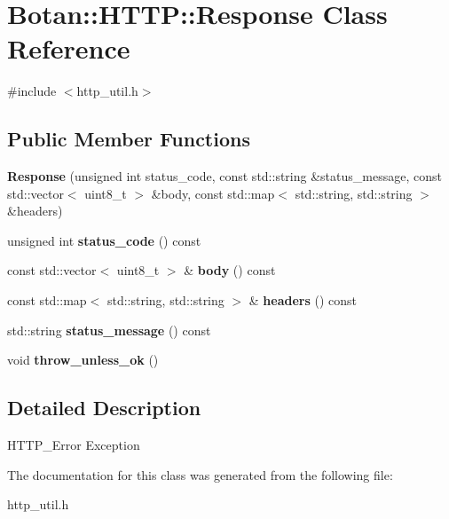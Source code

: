 \hypertarget{class_botan_1_1_h_t_t_p_1_1_response}{}\section{Botan\+:\+:H\+T\+TP\+:\+:Response Class Reference}
\label{class_botan_1_1_h_t_t_p_1_1_response}


{\ttfamily \#include $<$http\+\_\+util.\+h$>$}

\subsection*{Public Member Functions}
\begin{DoxyCompactItemize}
\item 
\mbox{\label{class_botan_1_1_h_t_t_p_1_1_response_ab2be529015e249d8909c10b0832ce8fe}} 
{\bfseries Response} (unsigned int status\+\_\+code, const std\+::string \&status\+\_\+message, const std\+::vector$<$ uint8\+\_\+t $>$ \&body, const std\+::map$<$ std\+::string, std\+::string $>$ \&headers)
\item 
\mbox{\label{class_botan_1_1_h_t_t_p_1_1_response_acb36408653d267e7254d5a00123c1498}} 
unsigned int {\bfseries status\+\_\+code} () const
\item 
\mbox{\label{class_botan_1_1_h_t_t_p_1_1_response_a1817e37c21dc13da97083ce1e8dc8db8}} 
const std\+::vector$<$ uint8\+\_\+t $>$ \& {\bfseries body} () const
\item 
\mbox{\label{class_botan_1_1_h_t_t_p_1_1_response_a3d19bcef9beca56286220316a3bde542}} 
const std\+::map$<$ std\+::string, std\+::string $>$ \& {\bfseries headers} () const
\item 
\mbox{\label{class_botan_1_1_h_t_t_p_1_1_response_ae5dc47c5f3f292a73722b8198f6b358a}} 
std\+::string {\bfseries status\+\_\+message} () const
\item 
\mbox{\label{class_botan_1_1_h_t_t_p_1_1_response_a3c4157d49499a3d25e112592a585490f}} 
void {\bfseries throw\+\_\+unless\+\_\+ok} ()
\end{DoxyCompactItemize}


\subsection{Detailed Description}
H\+T\+T\+P\+\_\+\+Error Exception 

The documentation for this class was generated from the following file\+:\begin{DoxyCompactItemize}
\item 
http\+\_\+util.\+h\end{DoxyCompactItemize}
